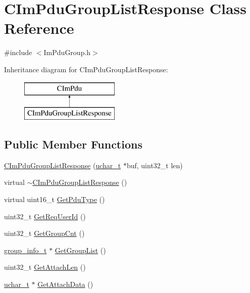 \hypertarget{class_c_im_pdu_group_list_response}{}\section{C\+Im\+Pdu\+Group\+List\+Response Class Reference}
\label{class_c_im_pdu_group_list_response}


{\ttfamily \#include $<$Im\+Pdu\+Group.\+h$>$}

Inheritance diagram for C\+Im\+Pdu\+Group\+List\+Response\+:\begin{figure}[H]
\begin{center}
\leavevmode
\includegraphics[height=2.000000cm]{class_c_im_pdu_group_list_response}
\end{center}
\end{figure}
\subsection*{Public Member Functions}
\begin{DoxyCompactItemize}
\item 
\hyperlink{class_c_im_pdu_group_list_response_a34666f8cf1acd765ba2404d9923e5f26}{C\+Im\+Pdu\+Group\+List\+Response} (\hyperlink{base_2ostype_8h_a124ea0f8f4a23a0a286b5582137f0b8d}{uchar\+\_\+t} $\ast$buf, uint32\+\_\+t len)
\item 
virtual \hyperlink{class_c_im_pdu_group_list_response_acc2657acb0d41f4c59d5eb11cea8aed8}{$\sim$\+C\+Im\+Pdu\+Group\+List\+Response} ()
\item 
virtual uint16\+\_\+t \hyperlink{class_c_im_pdu_group_list_response_a8f639731884f90a5262a9755c58a3ec0}{Get\+Pdu\+Type} ()
\item 
uint32\+\_\+t \hyperlink{class_c_im_pdu_group_list_response_aa9072cb6ce5623569d0f73c48222a799}{Get\+Req\+User\+Id} ()
\item 
uint32\+\_\+t \hyperlink{class_c_im_pdu_group_list_response_aec4fc6339310f92cd435ed1c04c6e02d}{Get\+Group\+Cnt} ()
\item 
\hyperlink{structgroup__info__t}{group\+\_\+info\+\_\+t} $\ast$ \hyperlink{class_c_im_pdu_group_list_response_a718be058512ff107ff3c8909b089533f}{Get\+Group\+List} ()
\item 
uint32\+\_\+t \hyperlink{class_c_im_pdu_group_list_response_a5426ff68cbabd97183ef86a24658a42d}{Get\+Attach\+Len} ()
\item 
\hyperlink{base_2ostype_8h_a124ea0f8f4a23a0a286b5582137f0b8d}{uchar\+\_\+t} $\ast$ \hyperlink{class_c_im_pdu_group_list_response_afcfa403516b16c138e9d38150403848c}{Get\+Attach\+Data} ()
\end{DoxyCompactItemize}

